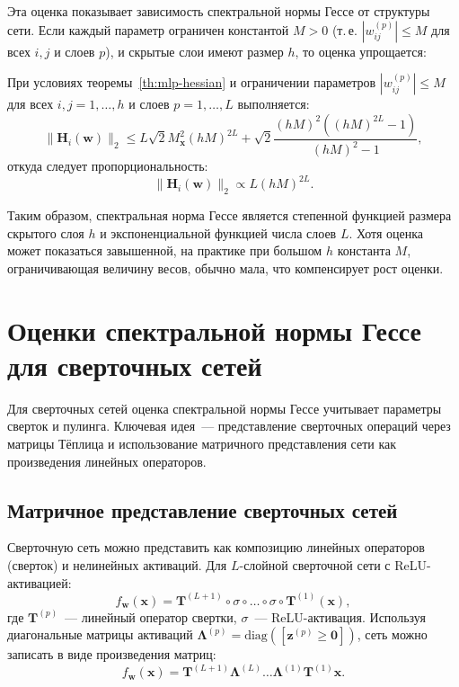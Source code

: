 Эта оценка показывает зависимость спектральной нормы Гессе от структуры сети. Если каждый параметр ограничен константой $M > 0$ (т.\,е. $|w_{ij}^{(p)}| \leqslant M$ для всех $i, j$ и слоев $p$), и скрытые слои имеют размер $h$, то оценка упрощается:

\begin{corollary}\label{cor:mlp-hessian-size}
При условиях теоремы~\ref{th:mlp-hessian} и ограничении параметров $|w_{ij}^{(p)}| \leqslant M$ для всех $i, j = 1, \ldots, h$ и слоев $p = 1, \ldots, L$ выполняется:
\begin{equation}
\|\mathbf{H}_i(\mathbf{w})\|_2 \leqslant L \sqrt{2} M_{\mathbf{x}}^2 (hM)^{2L} + \sqrt{2} \frac{(hM)^2 ((hM)^{2L} - 1)}{(hM)^2 - 1},
\end{equation}
откуда следует пропорциональность:
\begin{equation}
\|\mathbf{H}_i(\mathbf{w})\|_2 \propto L (hM)^{2L}.
\end{equation}
\end{corollary}

Таким образом, спектральная норма Гессе является степенной функцией размера скрытого слоя $h$ и экспоненциальной функцией числа слоев $L$. Хотя оценка может показаться завышенной, на практике при большом $h$ константа $M$, ограничивающая величину весов, обычно мала, что компенсирует рост оценки.

\section{Оценки спектральной нормы Гессе для сверточных сетей}

Для сверточных сетей оценка спектральной нормы Гессе учитывает параметры сверток и пулинга. Ключевая идея~--- представление сверточных операций через матрицы Тёплица и использование матричного представления сети как произведения линейных операторов.

\subsection{Матричное представление сверточных сетей}

Сверточную сеть можно представить как композицию линейных операторов (сверток) и нелинейных активаций. Для $L$-слойной сверточной сети с ReLU-активацией:
\[
f_{\mathbf{w}}(\mathbf{x}) = \mathbf{T}^{(L+1)} \circ \sigma \circ \ldots \circ \sigma \circ \mathbf{T}^{(1)}(\mathbf{x}),
\]
где $\mathbf{T}^{(p)}$~--- линейный оператор свертки, $\sigma$~--- ReLU-активация. Используя диагональные матрицы активаций $\boldsymbol{\Lambda}^{(p)} = \text{diag}([\mathbf{z}^{(p)} \geqslant \mathbf{0}])$, сеть можно записать в виде произведения матриц:
\begin{equation}
\label{eq:conv-matrix-repr}
f_{\mathbf{w}}(\mathbf{x}) = \mathbf{T}^{(L+1)} \boldsymbol{\Lambda}^{(L)} \ldots \boldsymbol{\Lambda}^{(1)} \mathbf{T}^{(1)} \mathbf{x}.
\end{equation}


